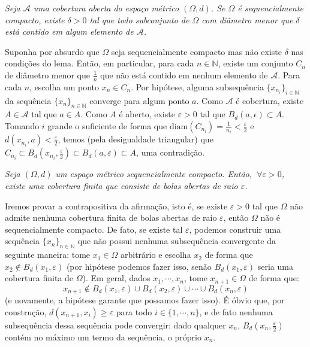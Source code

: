 \begin{lema}\label{lemaDelta}
\textit{Seja $\mathscr{A}$ uma cobertura aberta do espaço métrico $(\Omega, d)$. Se $\Omega$ é sequencialmente compacto, existe $\delta > 0$ tal que todo subconjunto de $\Omega$ com diâmetro menor que $\delta$ está contido em algum elemento de $\mathscr{A}$.}
\end{lema}
\begin{demm}
Suponha por absurdo que $\Omega$ seja sequencialmente compacto mas não existe $\delta$ nas condições do lema. Então, em particular, para cada $n \in \mathbb{N}$, existe um conjunto  $C_n$ de diâmetro menor que $\frac{1}{n}$ que não está contido em nenhum elemento de $\mathscr{A}$. Para cada $n$, escolha um ponto $x_n \in C_n$. Por hipótese, alguma subsequência $\{x_{n_i} \}_{i \in \mathbb{N}}$ da sequência $\{x_n\}_{n \in \mathbb{N}}$ converge para algum ponto $a$. Como $\mathscr{A}$ é cobertura, existe $A \in \mathscr{A}$ tal que $a \in A$. Como $A$ é aberto, existe $\varepsilon > 0$ tal que $B_d(a, \epsilon) \subset A$. Tomando $i$ grande o suficiente de forma que $\mathrm{diam}(C_{n_i}) = \frac{1}{n_i} < \frac{\varepsilon}{2}$  e $d(x_{n_i}, a) < \frac{\varepsilon}{2}$, temos (pela desigualdade triangular) que $C_{n_i} \subset B_d(x_{n_i}, \frac{\varepsilon}{2}) \subset B_d(a, \varepsilon) \subset A$, uma contradição.
\end{demm}
\begin{lema}\label{LemaTres}
\textit{Seja $(\Omega, d)$ um espaço métrico sequencialmente compacto. Então, $\ \forall \varepsilon > 0$, existe uma cobertura finita que consiste de bolas abertas de raio $\varepsilon$.}
\end{lema}
\begin{demm}
Iremos provar a contrapositiva da afirmação, isto é, se existe $\varepsilon > 0$ tal que $\Omega$ não admite nenhuma cobertura finita de bolas abertas de raio $\varepsilon$, então $\Omega$ não é sequencialmente compacto. De fato, se existe tal $\varepsilon$, podemos construir uma sequência $\{x_n\}_{n \in \mathbb{N}}$ que não possui nenhuma subsequência convergente da seguinte maneira: tome $x_1 \in \Omega$ arbitrário e escolha $x_2$ de forma que $x_2 \notin B_d(x_1, \varepsilon)$ (por hipótese podemos fazer isso, senão $B_d(x_1, \varepsilon)$ seria uma cobertura finita de $\Omega$). Em geral, dados $x_1, \cdots, x_n$, tome $x_{n+1} \in \Omega$ de forma que:
$$x_{n+1} \notin B_d(x_1, \varepsilon) \cup B_d(x_2, \varepsilon) \cup \cdots \cup B_d(x_n, \varepsilon)$$
(e novamente, a hipótese garante que possamos fazer isso). É óbvio que, por construção, $d(x_{n+1}, x_i) \geq \varepsilon$ para todo $i \in \{1, \cdots, n \}$, e de fato nenhuma subsequência dessa sequência pode convergir: dado qualquer $x_n$, $B_d(x_n, \frac{\varepsilon}{2})$ contém no máximo um termo da sequência, o próprio $x_n$.
\end{demm}
